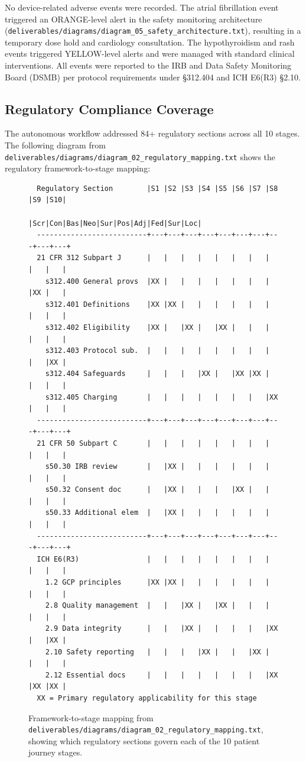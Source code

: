No device-related adverse events were recorded. The atrial fibrillation event triggered an ORANGE-level alert in the safety monitoring architecture (\texttt{deliverables/diagrams/diagram\_05\_safety\_architecture.txt}), resulting in a temporary dose hold and cardiology consultation. The hypothyroidism and rash events triggered YELLOW-level alerts and were managed with standard clinical interventions. All events were reported to the IRB and Data Safety Monitoring Board (DSMB) per protocol requirements under \S312.404 and ICH E6(R3) \S2.10.

\newpage

\subsection{Regulatory Compliance Coverage}

The autonomous workflow addressed 84+ regulatory sections across all 10 stages. The following diagram from \texttt{deliverables/diagrams/diagram\_02\_regulatory\_mapping.txt} shows the regulatory framework-to-stage mapping:



\begin{figure}[H]
\begin{verbatim}
  Regulatory Section        |S1 |S2 |S3 |S4 |S5 |S6 |S7 |S8 |S9 |S10|
                            |Scr|Con|Bas|Neo|Sur|Pos|Adj|Fed|Sur|Loc|
  --------------------------+---+---+---+---+---+---+---+---+---+---+
  21 CFR 312 Subpart J      |   |   |   |   |   |   |   |   |   |   |
    s312.400 General provs  |XX |   |   |   |   |   |   |   |XX |   |
    s312.401 Definitions    |XX |XX |   |   |   |   |   |   |   |   |
    s312.402 Eligibility    |XX |   |XX |   |XX |   |   |   |   |   |
    s312.403 Protocol sub.  |   |   |   |   |   |   |   |   |   |XX |
    s312.404 Safeguards     |   |   |   |XX |   |XX |XX |   |   |   |
    s312.405 Charging       |   |   |   |   |   |   |   |XX |   |   |
  --------------------------+---+---+---+---+---+---+---+---+---+---+
  21 CFR 50 Subpart C       |   |   |   |   |   |   |   |   |   |   |
    s50.30 IRB review       |   |XX |   |   |   |   |   |   |   |   |
    s50.32 Consent doc      |   |XX |   |   |   |XX |   |   |   |   |
    s50.33 Additional elem  |   |XX |   |   |   |   |   |   |   |   |
  --------------------------+---+---+---+---+---+---+---+---+---+---+
  ICH E6(R3)                |   |   |   |   |   |   |   |   |   |   |
    1.2 GCP principles      |XX |XX |   |   |   |   |   |   |   |   |
    2.8 Quality management  |   |   |XX |   |XX |   |   |   |   |   |
    2.9 Data integrity      |   |   |XX |   |   |   |   |XX |   |XX |
    2.10 Safety reporting   |   |   |   |XX |   |   |XX |   |   |   |
    2.12 Essential docs     |   |   |   |   |   |   |   |XX |XX |XX |
  XX = Primary regulatory applicability for this stage
\end{verbatim}
\caption{Framework-to-stage mapping from \texttt{deliverables/diagrams/diagram\_02\_regulatory\_mapping.txt}, showing which regulatory sections govern each of the 10 patient journey stages.}
\label{fig:reg-mapping}
\end{figure}

